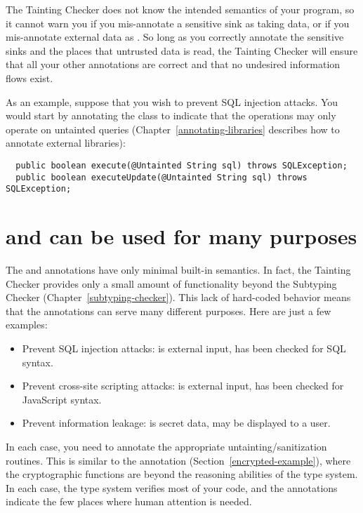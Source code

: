 The Tainting Checker does not know the intended semantics of your program,
so it cannot warn you if you mis-annotate a sensitive sink as taking
 data, or if you mis-annotate external data as
.  So long as you correctly annotate the sensitive sinks
and the places that untrusted data is read, the Tainting Checker will
ensure that all your other annotations are correct and that no undesired
information flows exist.

As an example, suppose that you wish to prevent SQL injection attacks.  You
would start by annotating the
 class to indicate that the
 operations may only operate on untainted queries
(Chapter~\ref{annotating-libraries} describes how to annotate external
libraries):

\begin{Verbatim}
  public boolean execute(@Untainted String sql) throws SQLException;
  public boolean executeUpdate(@Untainted String sql) throws SQLException;
\end{Verbatim}


\section{ and  can be used for many purposes\label{tainting-many-uses}}

The  and  annotations have only minimal
built-in semantics.  In fact, the Tainting Checker provides only a small
amount of functionality beyond the Subtyping Checker
(Chapter~\ref{subtyping-checker}).  This lack of hard-coded behavior means that
the annotations can serve many different purposes.  Here are just a few
examples:

\begin{itemize}
\item
  Prevent SQL injection attacks:   is external input,
   has been checked for SQL syntax.
\item
  Prevent cross-site scripting attacks:   is external input,
   has been checked for JavaScript syntax.
\item
  Prevent information leakage:   is secret data,
   may be displayed to a user.
\end{itemize}

In each case, you need to annotate the appropriate untainting/sanitization
routines.  This is similar to the  annotation
(Section~\ref{encrypted-example}), where the cryptographic functions are
beyond the reasoning abilities of the type system.  In each case, the type
system verifies most of your code, and the 
annotations indicate the few places where human attention is needed.


